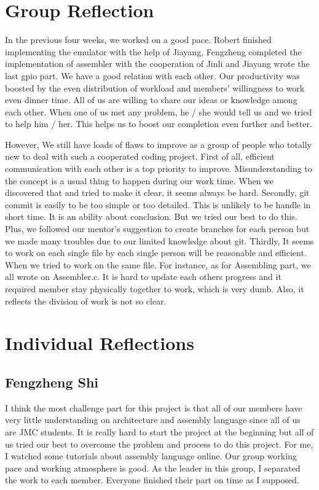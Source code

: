 \documentclass[11pt]{article}
\begin{document}
\section{Group Reflection}
In the previous four weeks, we worked on a good pace. Robert finished implementing the emulator with the help of Jiayang, Fengzheng completed the implementation of assembler with the cooperation of Jinli and Jiayang wrote the last gpio part. We have a good relation with each other. Our productivity was boosted by the even distribution of workload and members' willingness to work even dinner time. All of us are willing to share our ideas or knowledge among each other. When one of us met any problem, he / she would tell us and we tried to help him / her. This helps us to boost our completion even further and better.\newline

\noindent
However, We still have loads of flaws to improve as a group of people who totally new to deal with such a cooperated coding project. First of all, efficient communication with each other is a top priority to improve. Misunderstanding to the concept is a usual thing to happen during our work time. When we discovered that and tried to make it clear, it seems always be hard. Secondly, git commit is easily to be too simple or too detailed. This is unlikely to be handle in short time. It is an ability about conclusion. But we tried our best to do this. Plus, we followed our mentor's suggestion to create branches for each person but we made many troubles due to our limited knowledge about git. Thirdly, It seems to work on each single file by each single person will be reasonable and efficient. When we tried to work on the same file. For instance, as for Assembling part, we all wrote on Assembler.c. It is hard to update each others progress and it required member stay physically together to work, which is very dumb. Also, it reflects the division of work is not so clear.

\section{Individual Reflections}
\subsection{Fengzheng Shi}
I think the most challenge part for this project is that all of our members have very little understanding on architecture and assembly language since all of us are JMC students. It is really hard to start the project at the beginning but all of us tried our best to overcome the problem and process to do this project. For me, I watched some tutorials about assembly language online. Our group working pace and working atmosphere is good. As the leader in this group, I separated the work to each member. Everyone finished their part on time as I supposed. \newline
\end{document}
